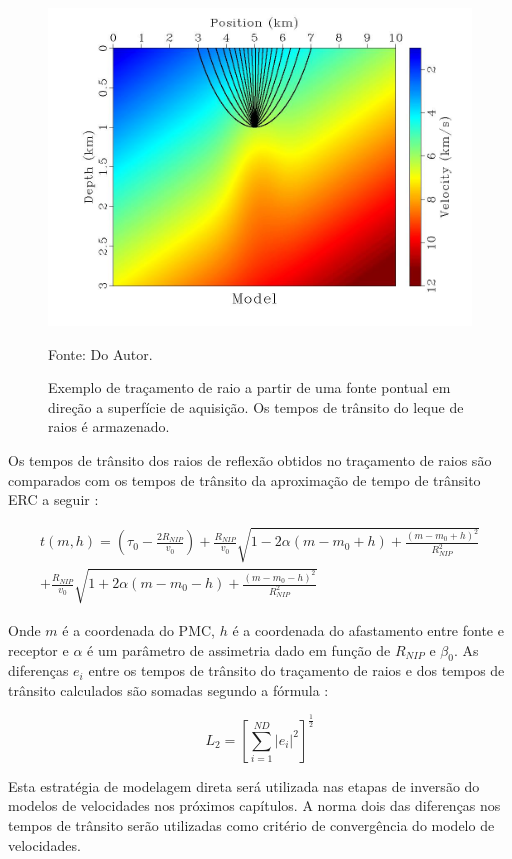 \begin{figure}[H]
\caption{Exemplo de traçamento de raio a partir de uma fonte pontual em direção a superfície de aquisição.
Os tempos de trânsito do leque de raios é armazenado.}
\begin{center}
\includegraphics[scale=0.3]{images/raioleque.jpg}
\vspace{-0.3cm}
\end{center}
\begin{center}
 Fonte: Do Autor.
\end{center}
\label{fig:2.3}
\end{figure}

Os tempos de trânsito dos raios de reflexão obtidos no traçamento de raios são comparados com os tempos
de trânsito da aproximação de tempo de trânsito ERC a seguir \cite{cre,relatorio}:

\begin{multline}
\label{eq:2.1}
t(m,h)= \left( \tau_0-\frac{2R_{NIP}}{v_0} \right) 
+\frac{R_{NIP}}{v_0}\sqrt{1-2\alpha(m-m_0+h)+\frac{(m-m_0+h)^2}{R_{NIP}^2}} \\
+\frac{R_{NIP}}{v_0}\sqrt{1+2\alpha(m-m_0-h)+\frac{(m-m_0-h)^2}{R_{NIP}^2}}
\end{multline}

Onde $m$ é a coordenada do PMC, $h$ é a coordenada do afastamento entre fonte e receptor e
$\alpha$ é um parâmetro de assimetria dado em função de $R_{NIP}$ e $\beta_0$.
As diferenças $e_i$ entre os tempos de trânsito do traçamento de raios e dos tempos de trânsito
calculados são somadas segundo a fórmula \cite{stoffa}:

\begin{equation}
\label{eq:2.2}
L_2 = \left[ \sum_{i=1}^{ND} |e_i|^2 \right]^\frac{1}{2}
\end{equation}


Esta estratégia de modelagem direta será utilizada nas etapas de inversão do modelos de velocidades nos
próximos capítulos. A norma dois das diferenças nos tempos de trânsito serão utilizadas como critério de
convergência do modelo de velocidades.

